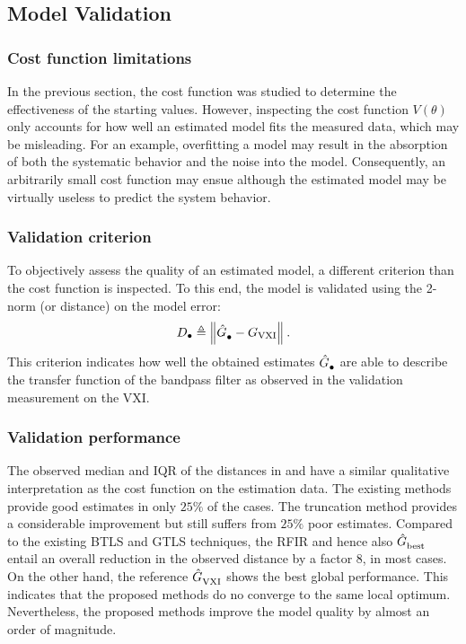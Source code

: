\subsection{Model Validation}
\subsubsection{Cost function limitations}
In the previous section, the cost function was studied to determine the effectiveness of the starting values.
However, inspecting the cost function $V(\theta)$ only accounts for how well an estimated model fits the measured data, which may be misleading.
For an example, overfitting a model may result in the absorption of both the systematic behavior and the noise into the model. 
Consequently, an arbitrarily small cost function may ensue although the estimated model may be virtually useless to predict the system behavior.

\subsubsection{Validation criterion}
To objectively assess the quality of an estimated model, a different criterion than the cost function is inspected.
To this end, the model is validated using the 2-norm (or distance) on the model error:
\begin{equation}
  D_{\bullet} 
  \triangleq 
  \left\| \hat{G}_{\mathrm{\bullet}}^{\mathrm{}} - G_{\mathrm{VXI}} \right\|_{}
  \text{.}
  \label{eq:measurementCriterion}
\end{equation} 
This criterion indicates how well the obtained estimates $\hat{G}_{\mathrm{\bullet}}^{\mathrm{}}$ are able to describe the transfer function of the bandpass filter as observed in the validation measurement on the VXI.

\subsubsection{Validation performance}
The observed median and IQR of the distances in  and  have a similar qualitative interpretation as the cost function on the estimation data.
The existing methods provide good estimates in only $25\%$ of the cases.
The truncation method provides a considerable improvement but still suffers from $25\%$ poor estimates.
Compared to the existing BTLS and GTLS techniques, the RFIR and hence also $\hat{G}_{\mathrm{best}}^{\mathrm{}}$ entail an overall reduction in the observed distance by a factor $8$, in most cases. 
On the other hand, the reference $\hat{G}_{\mathrm{VXI}}^{\mathrm{}}$ shows the best global performance. 
This indicates that the proposed methods do no converge to the same local optimum.
Nevertheless, the proposed methods improve the model quality by almost an order of magnitude.

